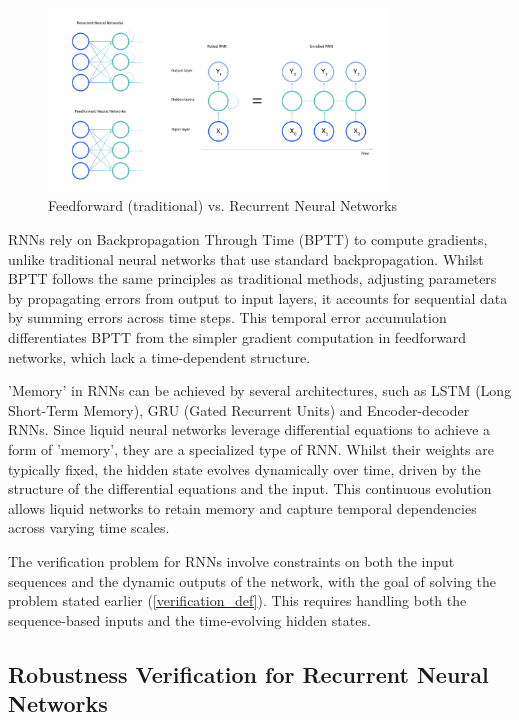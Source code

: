 \begin{figure}[h!]
    \centering
    \includegraphics[width=0.8\textwidth]{images/RNN_vs_FeedForward.png}
    \caption{Feedforward (traditional) vs. Recurrent Neural Networks}
    \label{fig:example_image}
\end{figure}

RNNs rely on Backpropagation Through Time (BPTT) to compute gradients, unlike traditional neural networks that use standard backpropagation. Whilst BPTT follows the same principles as traditional methods, adjusting parameters by propagating errors from output to input layers, it accounts for sequential data by summing errors across time steps. This temporal error accumulation differentiates BPTT from the simpler gradient computation in feedforward networks, which lack a time-dependent structure.

'Memory' in RNNs can be achieved by several architectures, such as LSTM (Long Short-Term Memory), GRU (Gated Recurrent Units) and Encoder-decoder RNNs. Since liquid neural networks leverage differential equations to achieve a form of 'memory', they are a specialized type of RNN. Whilst their weights are typically fixed, the hidden state evolves dynamically over time, driven by the structure of the differential equations and the input. This continuous evolution allows liquid networks to retain memory and capture temporal dependencies across varying time scales.

The verification problem for RNNs involve constraints on both the input sequences and the dynamic outputs of the network, with the goal of solving the problem stated earlier (\ref{verification_def}). This requires handling both the sequence-based inputs and the time-evolving hidden states.

\subsection{Robustness Verification for Recurrent Neural Networks}

